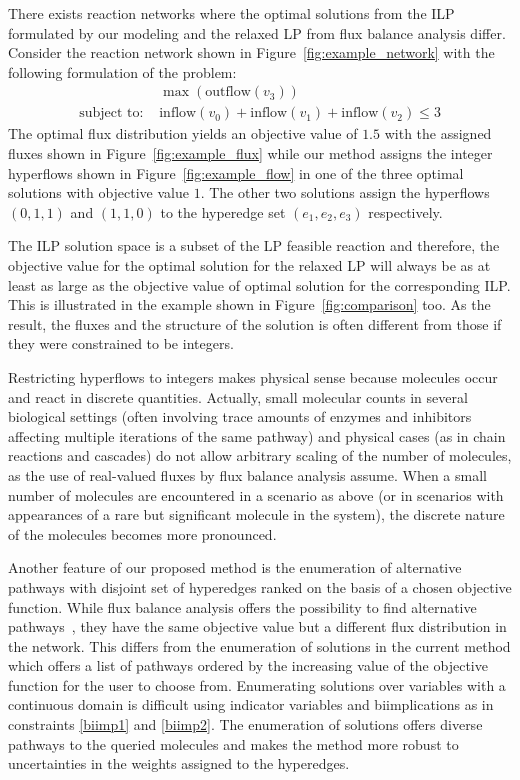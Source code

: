 There exists reaction networks where the optimal solutions from the ILP formulated by our modeling and the relaxed LP from flux balance analysis differ. Consider the reaction network shown in Figure~\ref{fig:example_network} with the following formulation of the problem:
\begin{align*}
    &\max \left( \text{outflow}(v_3) \right) \\
    \text{subject to: } &\text{inflow}(v_0) + \text{inflow}(v_1) +\text{inflow}(v_2) \leq 3
\end{align*}
The optimal flux distribution yields an objective value of $1.5$ with the assigned fluxes shown in Figure~\ref{fig:example_flux} while our method assigns the integer hyperflows shown in Figure~\ref{fig:example_flow} in one of the three optimal solutions with objective value $1$. The other two solutions assign the hyperflows $(0,1,1)$ and $(1,1,0)$ to the hyperedge set $(e_1,e_2,e_3)$ respectively.

The ILP solution space is a subset of the LP feasible reaction and therefore, the objective value for the optimal solution for the relaxed LP will always be as at least as large as the objective value of optimal solution for the corresponding ILP. This is illustrated in the example shown in Figure~\ref{fig:comparison} too. As the result, the fluxes and the structure of the solution is often different from those if they were constrained to be integers.

Restricting hyperflows to integers makes physical sense because molecules occur and react in discrete quantities.
Actually, small molecular counts in several biological settings (often involving trace amounts of enzymes and inhibitors affecting multiple iterations of the same pathway) and physical cases (as in chain reactions and cascades) do not allow arbitrary scaling of the number of molecules, as the use of real-valued fluxes by flux balance analysis assume.
When a small number of molecules are encountered in a scenario as above (or in scenarios with appearances of a rare but significant molecule in the system), the discrete nature of the molecules becomes more pronounced.

Another feature of our proposed method is the enumeration of alternative pathways with disjoint set of hyperedges ranked on the basis of a chosen objective function. While flux balance analysis offers the possibility to find alternative pathways~\cite{fba_alternative_pathways}, they have the same objective value but a different flux distribution in the network. This differs from the enumeration of solutions in the current method which offers a list of pathways ordered by the increasing value of the objective function for the user to choose from. Enumerating solutions over variables with a continuous domain is difficult using indicator variables and biimplications as in constraints \ref{biimp1}  and \ref{biimp2}. The enumeration of solutions offers diverse pathways to the queried molecules and makes the method more robust to uncertainties in the weights assigned to the hyperedges.
